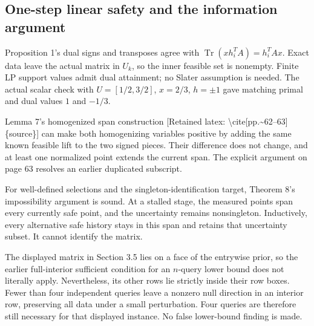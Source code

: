 \documentclass[10pt]{article}
\begin{document}
\subsection*{One-step linear safety and the information argument}
Proposition 1’s dual signs and transposes agree with \(\operatorname{Tr}(xh_i^TA)=h_i^TAx\). Exact data leave the actual matrix in \(U_k\), so the inner feasible set is nonempty. Finite LP support values admit dual attainment; no Slater assumption is needed. The actual scalar check with \(U=[1/2,3/2]\), \(x=2/3\), \(h=\pm1\) gave matching primal and dual values \(1\) and \(-1/3\).\par
Lemma 7’s homogenized span construction [Retained latex: \textbackslash{}cite[pp.\textasciitilde{}62--63]\{source\}] can make both homogenizing variables positive by adding the same known feasible lift to the two signed pieces. Their difference does not change, and at least one normalized point extends the current span. The explicit argument on page 63 resolves an earlier duplicated subscript.\par
For well-defined selections and the singleton-identification target, Theorem 8’s impossibility argument is sound. At a stalled stage, the measured points span every currently safe point, and the uncertainty remains nonsingleton. Inductively, every alternative safe history stays in this span and retains that uncertainty subset. It cannot identify the matrix.\par
The displayed matrix in Section 3.5 lies on a face of the entrywise prior, so the earlier full-interior sufficient condition for an \(n\)-query lower bound does not literally apply. Nevertheless, its other rows lie strictly inside their row boxes. Fewer than four independent queries leave a nonzero null direction in an interior row, preserving all data under a small perturbation. Four queries are therefore still necessary for that displayed instance. No false lower-bound finding is made.\par
\end{document}
